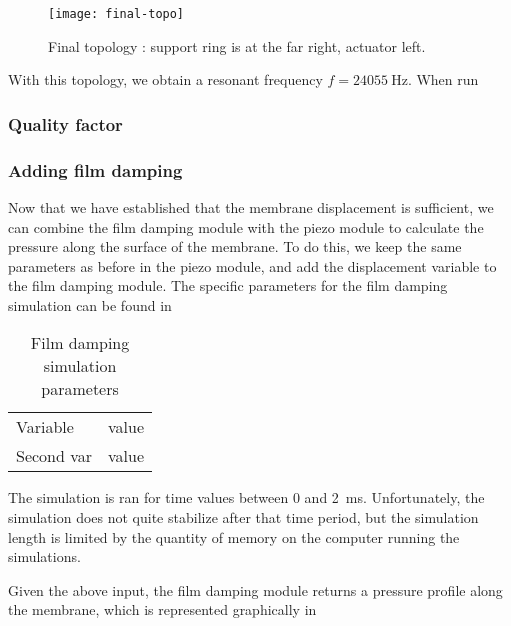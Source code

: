 \begin{figure}[h]
  \begin{center}
    \texttt{[image: final-topo]}
  \end{center}
  \caption{Final topology : support ring is at the far right, actuator left.}
  \label{fig:final-overview}
\end{figure}


With this topology, we obtain a resonant frequency $f = \SI{24055}{\hertz}$.
When run 



\subsubsection{Quality factor}
\subsubsection{Adding film damping}

Now that we have established that the membrane displacement is sufficient, we
can combine the film damping module with the piezo module to calculate the
pressure along the surface of the membrane. To do this, we keep the same
parameters as before in the piezo module, and add the displacement variable to
the film damping module. The specific parameters for the film damping simulation
can be found in 

\begin{table}[h]
  \centering
  \begin{tabular}{l|l}
    Variable				& value		\\
    Second var				& value 	\\
  \end{tabular}
  \caption{Film damping simulation parameters}
  \label{tab:film-damping}
\end{table}

The simulation is ran for time values between 0 and \SI{2}{\milli\second}.
Unfortunately, the simulation does not quite stabilize after that time period,
but the simulation length is limited by the quantity of memory on the computer
running the simulations.

Given the above input, the film damping module returns a pressure profile along
the membrane, which is represented graphically in 

